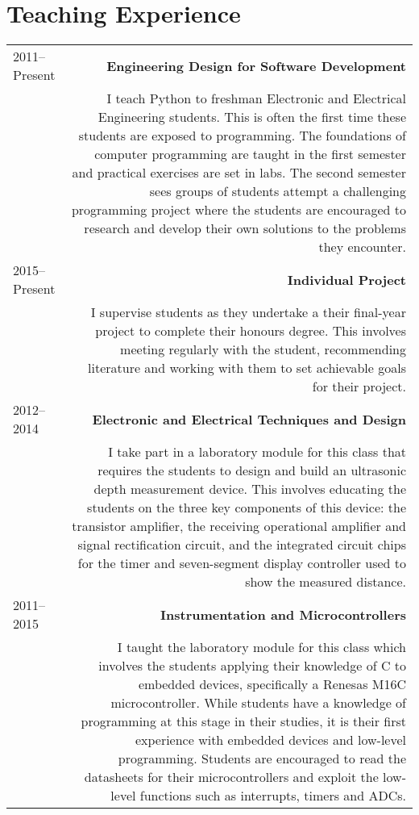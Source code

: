 \section*{Teaching Experience}
\begin{longtable}{L!{\VRule}R}
2011--Present&\textbf{Engineering Design for Software Development}\\[5pt]
&I teach Python to freshman Electronic and Electrical Engineering students. This is often the first time these students are exposed to programming. The foundations of computer programming are taught in the first semester and practical exercises are set in labs. The second semester sees groups of students attempt a challenging programming project where the students are encouraged to research and develop their own solutions to the problems they encounter.\\[5pt]
2015--Present&\textbf{Individual Project}\\[5pt]
&I supervise students as they undertake a their final-year project to complete their honours degree. This involves meeting regularly with the student, recommending literature and working with them to set achievable goals for their project.\\[5pt]
2012--2014&\textbf{Electronic and Electrical Techniques and Design}\\[5pt]
&I take part in a laboratory module for this class that requires the students to design and build an ultrasonic depth measurement device. This involves educating the students on the three key components of this device: the transistor amplifier, the receiving operational amplifier and signal rectification circuit, and the integrated circuit chips for the timer and seven-segment display controller used to show the measured distance.\\[5pt]
2011--2015&\textbf{Instrumentation and Microcontrollers}\\[5pt]
&I taught the laboratory module for this class which involves the students applying their knowledge of C to embedded devices, specifically a Renesas M16C microcontroller. While students have a knowledge of programming at this stage in their studies, it is their first experience with embedded devices and low-level programming. Students are encouraged to read the datasheets for their microcontrollers and exploit the low-level functions such as interrupts, timers and ADCs.\\[5pt]
\end{longtable}